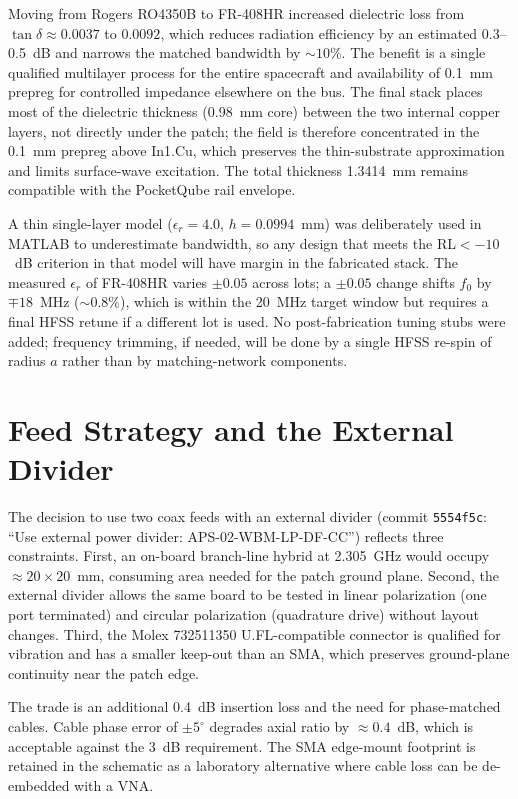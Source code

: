Moving from Rogers RO4350B to FR-408HR increased dielectric loss from $\tan\delta \approx 0.0037$ to $0.0092$, which reduces radiation efficiency by an estimated 0.3--0.5~dB and narrows the matched bandwidth by $\sim 10\%$. The benefit is a single qualified multilayer process for the entire spacecraft and availability of 0.1~mm prepreg for controlled impedance elsewhere on the bus. The final stack places most of the dielectric thickness (0.98~mm core) between the two internal copper layers, not directly under the patch; the field is therefore concentrated in the 0.1~mm prepreg above In1.Cu, which preserves the thin-substrate approximation and limits surface-wave excitation. The total thickness 1.3414~mm remains compatible with the PocketQube rail envelope.

A thin single-layer model ($\epsilon_r=4.0$, $h=0.0994$~mm) was deliberately used in MATLAB to underestimate bandwidth, so any design that meets the RL${}<-10$~dB criterion in that model will have margin in the fabricated stack. The measured $\epsilon_r$ of FR-408HR varies $\pm 0.05$ across lots; a $\pm 0.05$ change shifts $f_0$ by $\mp 18$~MHz ($\sim 0.8\%$), which is within the 20~MHz target window but requires a final HFSS retune if a different lot is used. No post-fabrication tuning stubs were added; frequency trimming, if needed, will be done by a single HFSS re-spin of radius $a$ rather than by matching-network components.

\section{Feed Strategy and the External Divider}

The decision to use two coax feeds with an external divider (commit \texttt{5554f5c}: ``Use external power divider: APS-02-WBM-LP-DF-CC'') reflects three constraints. First, an on-board branch-line hybrid at 2.305~GHz would occupy $\approx 20 \times 20$~mm, consuming area needed for the patch ground plane. Second, the external divider allows the same board to be tested in linear polarization (one port terminated) and circular polarization (quadrature drive) without layout changes. Third, the Molex 732511350 U.FL-compatible connector is qualified for vibration and has a smaller keep-out than an SMA, which preserves ground-plane continuity near the patch edge.

The trade is an additional 0.4~dB insertion loss and the need for phase-matched cables. Cable phase error of $\pm 5^{\circ}$ degrades axial ratio by $\approx 0.4$~dB, which is acceptable against the 3~dB requirement. The SMA edge-mount footprint is retained in the schematic as a laboratory alternative where cable loss can be de-embedded with a VNA.

